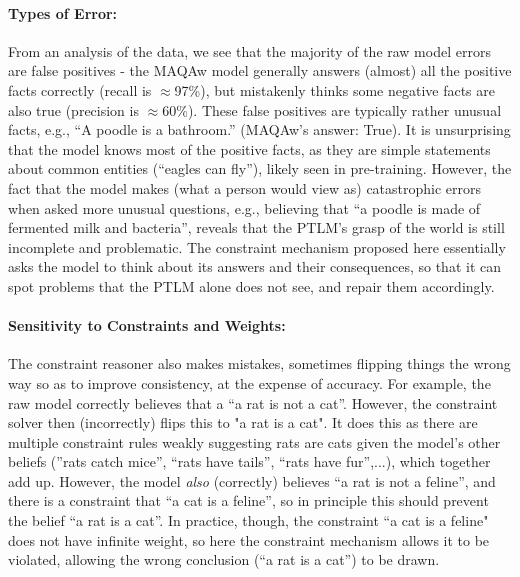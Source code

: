 \documentclass[11pt]{article}
\begin{document}
\paragraph{Types of Error:} From an analysis of the data, we see that the majority of the raw model errors
are false positives - the MAQAw model generally answers (almost) all the positive facts correctly (recall is $\approx$97\%),
but mistakenly thinks some negative facts are also true (precision is $\approx$60\%).
These false positives are typically rather unusual facts, e.g., ``A poodle is a bathroom.'' (MAQAw's answer: True).  
It is unsurprising that the model knows most of the positive facts, as they are simple statements about 
common entities (``eagles can fly''), likely seen in pre-training. However, the fact that the model 
makes (what a person would view as) catastrophic errors when asked more unusual
questions, e.g., believing that ``a poodle is made of fermented milk and bacteria'', 
reveals that the PTLM's grasp of the world is still incomplete and problematic. The constraint mechanism
proposed here essentially asks the model to think about its answers and their consequences,
so that it can spot problems that the PTLM alone does not see, and repair them accordingly.

\paragraph{Sensitivity to Constraints and Weights:} 
The constraint reasoner also makes mistakes, sometimes flipping things the wrong way
so as to improve consistency, at the expense of accuracy. For example, the raw model
correctly believes that a ``a rat is not a cat''. 
However, the constraint solver then (incorrectly) flips this to "a rat is a cat". It does this as
there are multiple constraint rules weakly suggesting rats are cats given the model's other beliefs
(''rats catch mice'', ``rats have tails'', ``rats have fur'',...), which together add up. However,
the model {\it also} (correctly) believes ``a rat is not a feline'', and there is a constraint
that ``a cat is a feline'', so in principle this should prevent the belief ``a rat is a cat''.
In practice, though, the constraint ``a cat is a feline" does not have infinite weight,
so here the constraint mechanism allows it to be violated, allowing the wrong
conclusion (``a rat is a cat'') to be drawn.
\end{document}
